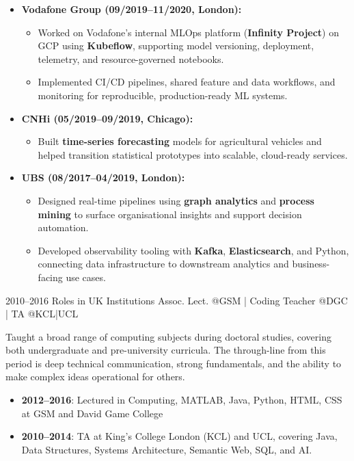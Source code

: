 \documentclass[]{../../friggeri-cv}
\begin{document}
\begin{entrylist}
{{        }
        \begin{itemize}[left=-1.5em]
            \item \footnotesize\textbf{Vodafone Group (09/2019–11/2020, London):}
                \begin{itemize}
                    \item \footnotesize Worked on Vodafone's internal MLOps platform (\textbf{Infinity Project}) on GCP using \textbf{Kubeflow}, supporting model versioning, deployment, telemetry, and resource-governed notebooks.
                    \item \footnotesize Implemented CI/CD pipelines, shared feature and data workflows, and monitoring for reproducible, production-ready ML systems.
                \end{itemize}
            \item \footnotesize\textbf{CNHi (05/2019–09/2019, Chicago):}
                \begin{itemize}
                    \item \footnotesize Built \textbf{time-series forecasting} models for agricultural vehicles and helped transition statistical prototypes into scalable, cloud-ready services.
                \end{itemize}
            \item \footnotesize\textbf{UBS (08/2017–04/2019, London):}
                \begin{itemize}
                    \item \footnotesize Designed real-time pipelines using \textbf{graph analytics} and \textbf{process mining} to surface organisational insights and support decision automation.
                    \item \footnotesize Developed observability tooling with \textbf{Kafka}, \textbf{Elasticsearch}, and Python, connecting data infrastructure to downstream analytics and business-facing use cases.
                \end{itemize}
        \end{itemize}
    }
    \entry
    {\footnotesize 2010–2016}
    {Roles in UK Institutions}
    {\small Assoc. Lect. @GSM | Coding Teacher @DGC | TA @KCL|UCL}
    {
        {\small
        \setlength{\parindent}{-1.5em}
        \setlength{\leftskip}{-1.5em}
        Taught a broad range of computing subjects during doctoral studies, covering both undergraduate and pre-university curricula. The through-line from this period is deep technical communication, strong fundamentals, and the ability to make complex ideas operational for others.

        }
        \begin{itemize}[left=-1.5em]
            \item {\footnotesize \textbf{2012–2016}: Lectured in Computing, MATLAB, Java, Python, HTML, CSS at GSM and David Game College}
            \item {\footnotesize \textbf{2010–2014}: TA at King’s College London (KCL) and UCL, covering Java, Data Structures, Systems Architecture, Semantic Web, SQL, and AI.}
        \end{itemize}
    }
\end{entrylist}
\end{document}
